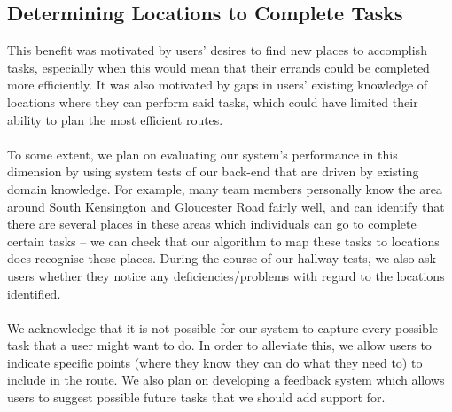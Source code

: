 \documentclass[a4paper, 10pt]{article}
\begin{document}
\subsection{Determining Locations to Complete Tasks}
This benefit was motivated by users' desires to find new places to accomplish tasks, especially when this would mean that their errands could be completed more efficiently. It was also motivated by gaps in users' existing knowledge of locations where they can perform said tasks, which could have limited their ability to plan the most efficient routes.\\\\ 
To some extent, we plan on evaluating our system's performance in this dimension by using system tests of our back-end that are driven by existing domain knowledge. For example, many team members personally know the area around South Kensington and Gloucester Road fairly well, and can identify that there are several places in these areas which individuals can go to complete certain tasks -- we can check that our algorithm to map these tasks to locations does recognise these places. During the course of our hallway tests, we also ask users whether they notice any deficiencies/problems with regard to the locations identified. \\\\
We acknowledge that it is not possible for our system to capture every possible task that a user might want to do. In order to alleviate this, we allow users to indicate specific points (where they know they can do what they need to) to include in the route. We also plan on developing a feedback system which allows users to suggest possible future tasks that we should add support for.
\end{document}
